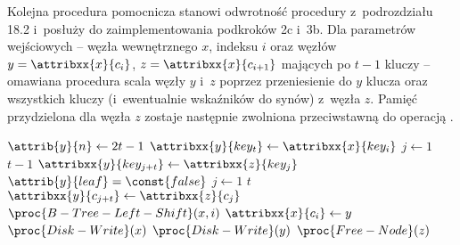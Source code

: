 Kolejna procedura pomocnicza stanowi odwrotność procedury  z~podrozdziału 18.2 i~posłuży do zaimplementowania podkroków 2c i~3b.
Dla parametrów wejściowych -- węzła wewnętrznego $x$, indeksu $i$ oraz węzłów $y=\attribxx{x}{c_i}$, $z=\attribxx{x}{c_{i+1}}$ mających po $t-1$ kluczy -- omawiana procedura scala węzły $y$ i~$z$ poprzez przeniesienie do $y$ klucza  oraz wszystkich kluczy (i~ewentualnie wskaźników do synów) z~węzła $z$.
Pamięć przydzielona dla węzła $z$ zostaje następnie zwolniona przeciwstawną do  operacją .
\begin{codebox}
    \li $\attrib{y}{n}\gets 2t-1$
    \li $\attribxx{y}{key_t}\gets\attribxx{x}{key_i}$
    \li \For $j\gets1$ \To $t-1$
    \li     \Do $\attribxx{y}{key_{j+t}}\gets\attribxx{z}{key_j}$
            \End
    \li \If $\attrib{y}{leaf}=\const{false}$
    \li     \Then \For $j\gets 1$ \To $t$
    \li         \Do $\attribxx{y}{c_{j+t}}\gets\attribxx{z}{c_j}$
                \End
            \End
    \li $\proc{B-Tree-Left-Shift}(x,i)$
    \li $\attribxx{x}{c_i}\gets y$
    \li $\proc{Disk-Write}(x)$
    \li $\proc{Disk-Write}(y)$
    \li $\proc{Free-Node}(z)$
\end{codebox}

